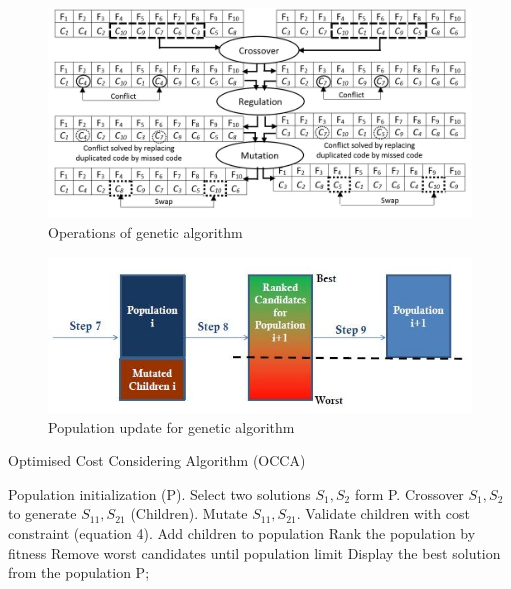 \documentclass[twocolumn,12pt,a4paper]{article}
\begin{document}
\begin{figure}[h]
\begin{center}
\includegraphics[scale=0.28]{Images/Drawing2.jpg}
\caption{Operations of genetic algorithm}
\end{center}
\label{Fig3}
\end{figure}

\begin{figure}[!thpb]
\begin{center}
\includegraphics[scale=0.3]{Images/Drawing_1.jpg}
\caption{Population update for genetic algorithm}
\end{center}
\label{Fig2}
\end{figure}

\begin{algorithm}[!thpb]
\caption{Optimised Cost Considering Algorithm (OCCA)}
\begin{algorithmic}[1]
\State Population initialization (P).
\REPEAT  
\State Select two solutions $S_{1},S_{2}$ form P.
\State Crossover $S_{1},S_{2}$ to generate $S_{11},S_{21}$ (Children).
\State Mutate $S_{11},S_{21}$.
\State Validate children with cost constraint (equation 4). 
\State Add children to population
\State Rank the population by fitness
\State Remove worst candidates until population limit
\EndWhile
\State Display the best solution from the population P;
\end{algorithmic}
\end{algorithm}
\end{document}
